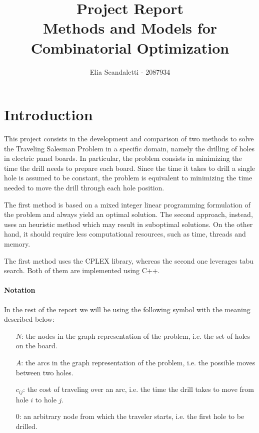 \documentclass{article}
\title{
    Project Report
    \\ \Large
    Methods and Models for Combinatorial Optimization 
    }
\author{Elia Scandaletti - 2087934}
\begin{document}
\maketitle

\section{Introduction}

This project consists in the development and comparison of two methods to solve the Traveling Salesman Problem in a specific domain, namely the drilling of holes in electric panel boards.
In particular, the problem consists in minimizing the time the drill needs to prepare each board.
Since the time it takes to drill a single hole is assumed to be constant, the problem is equivalent to minimizing the time needed to move the drill through each hole position.

The first method is based on a mixed integer linear programming formulation of the problem and always yield an optimal solution.
The second approach, instead, uses an heuristic method which may result in suboptimal solutions.
On the other hand, it should require less computational resources, such as time, threads and memory.

The first method uses the CPLEX library, whereas the second one leverages tabu search.
Both of them are implemented using C++.

\paragraph{Notation}
In the rest of the report we will be using the following symbol with the meaning described below:
\begin{itemize}
    \item[$N$:] the nodes in the graph representation of the problem, i.e. the set of holes on the board.
    \item[$A$:] the arcs in the graph representation of the problem, i.e. the possible moves between two holes.
    \item[$c_{i j}$:] the cost of traveling over an arc, i.e. the time the drill takes to move from hole $i$ to hole $j$.
    \item[$0$:] an arbitrary node from which the traveler starts, i.e. the first hole to be drilled.
\end{itemize}
\end{document}
